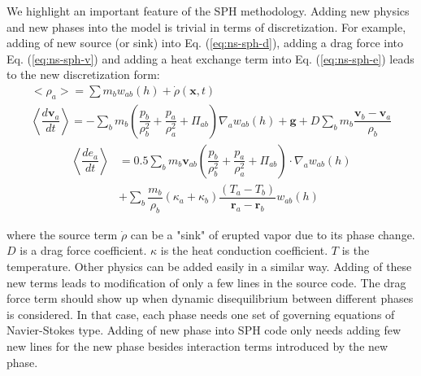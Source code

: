 We highlight an important feature of the SPH methodology. Adding new physics and new phases into the model is trivial in terms of discretization. For example, adding of new source (or sink) into Eq. (\ref{eq:ns-sph-d}), adding a drag force into Eq. (\ref{eq:ns-sph-v})  and adding a heat exchange term into Eq. (\ref{eq:ns-sph-e}) leads to the new discretization form:
\begin{align}
<\rho_a> = \sum m_b w_{ab} \left(h\right) + \dot{\rho}\left(\textbf{x},t\right)\label{eq:ns-source-sph-d} \\
\left\langle\dfrac{d \textbf{v}_a}{d t}\right\rangle= -\sum_b m_b \left(\dfrac{p_b}{\rho_b^2} + \dfrac{p_a}{\rho_a^2} + \Pi_{ab}\right) \nabla_a w_{a b}\left(h\right) +\textbf{g} + D \sum	_b m_b \dfrac{\textbf{v}_b - \textbf{v}_a}{\rho_b} \label{eq:ns-drag-sph-v}
\end{align}
\begin{equation}
\begin{split}
\left\langle\dfrac{d e_a}{d t}\right\rangle
&= 0.5\sum_b m_b \textbf{v}_{a b}\left(\dfrac{p_b}{\rho_b^2} + \dfrac{p_a}{\rho_a^2} + \Pi_{ab}\right) \cdot \nabla_a w_{a b}\left(h\right) \\
&+ \sum_b \dfrac{m_b}{\rho_b}\left(\kappa_a + \kappa_b\right) \dfrac{\left(T_a - T_b\right)}{\textbf{r}_a - \textbf{r}_b} w_{ab}\left(h\right) \label{eq:ns-conduction-sph-e}
\end{split}
\end{equation}

where the source term $\dot{\rho}$ can be a "sink" of erupted vapor due to its phase change.
$D$ is a drag force coefficient. $\kappa$ is the heat conduction coefficient. $T$ is the temperature. Other physics can be added easily in a similar way. Adding of these new terms leads to modification of only a few lines in the source code. The drag force term should show up when dynamic disequilibrium between different phases is considered. In that case, each phase needs one set of governing equations of Navier-Stokes type. Adding of new phase into SPH code only needs adding few new lines for the new phase besides interaction terms introduced by the new phase.

